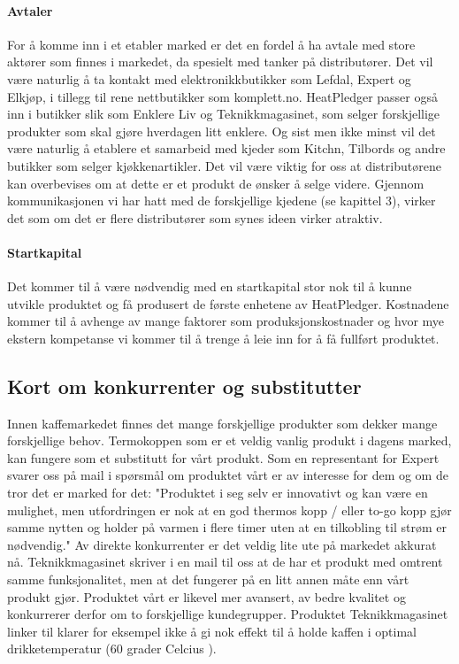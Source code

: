 \paragraph{Avtaler}
For å komme inn i et etabler marked er det en fordel å ha avtale med store aktører som finnes i markedet, da spesielt med tanker på distributører. Det vil være naturlig å ta kontakt med elektronikkbutikker som Lefdal, Expert og Elkjøp, i tillegg til rene nettbutikker som komplett.no. HeatPledger passer også inn i butikker slik som Enklere Liv og Teknikkmagasinet, som selger forskjellige produkter som skal gjøre hverdagen litt enklere. Og sist men ikke minst vil det være naturlig å etablere et samarbeid med kjeder som Kitchn, Tilbords og andre butikker som selger kjøkkenartikler. Det vil være viktig for oss at distributørene kan overbevises om at dette er et produkt de ønsker å selge videre. Gjennom kommunikasjonen vi har hatt med de forskjellige kjedene (se kapittel 3), virker det som om det er flere distributører som synes ideen virker atraktiv.

\paragraph{Startkapital}
Det kommer til å være nødvendig med en startkapital stor nok til å kunne utvikle produktet og få produsert de første enhetene av HeatPledger. Kostnadene kommer til å avhenge av mange faktorer som produksjonskostnader og hvor mye ekstern kompetanse vi kommer til å trenge å leie inn for å få fullført produktet. 

\subsection{Kort om konkurrenter og substitutter}
Innen kaffemarkedet finnes det mange forskjellige produkter som dekker mange forskjellige behov. Termokoppen som er et veldig vanlig produkt i dagens marked, kan fungere som et substitutt for vårt produkt. Som en representant for Expert svarer oss på mail i spørsmål om produktet vårt er av interesse for dem og om de tror det er marked for det: "Produktet i seg selv er innovativt og kan være en mulighet, men utfordringen er nok at en god thermos kopp / eller to-go kopp gjør samme nytten og holder på varmen i flere timer uten at en tilkobling til strøm er nødvendig." Av direkte konkurrenter er det veldig lite ute på markedet akkurat nå. Teknikkmagasinet skriver i en mail til oss at de har et produkt med omtrent samme funksjonalitet, men at det fungerer på en litt annen måte enn vårt produkt gjør. Produktet vårt er likevel mer avansert, av bedre kvalitet og konkurrerer derfor om to forskjellige kundegrupper. Produktet Teknikkmagasinet linker til \cite{tmprod} klarer for eksempel ikke å gi nok effekt til å holde kaffen i optimal drikketemperatur (60 grader Celcius \cite{optimaldrikketemperatur}). 

